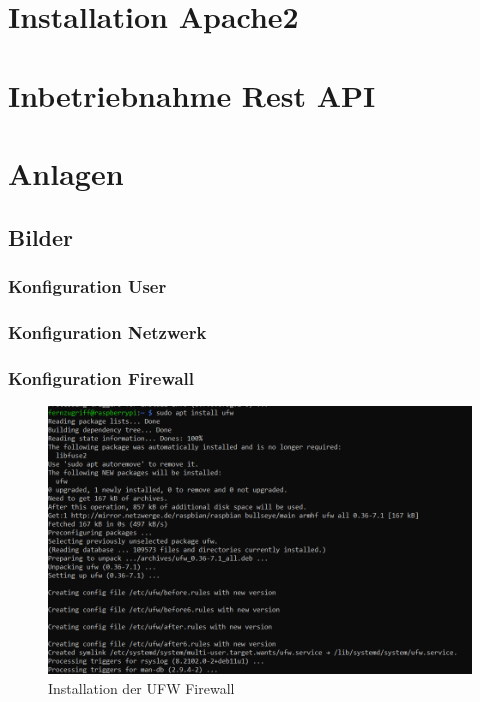 \documentclass[a4paper, 11pt]{scrartcl}
\begin{document}
\section{Installation Apache2}



\section{Inbetriebnahme Rest API}



\newpage
\section{Anlagen}
\subsection{Bilder}

\subsubsection{Konfiguration User}


\subsubsection{Konfiguration Netzwerk}




\subsubsection{Konfiguration Firewall}
\begin{figure}[H]
    \begin{center}
        \includegraphics[scale=0.7]{Bilder/install_firewall.png}
        \caption{Installation der UFW Firewall}\label{pic:install_firewall}
    \end{center}
\end{figure}
\end{document}
